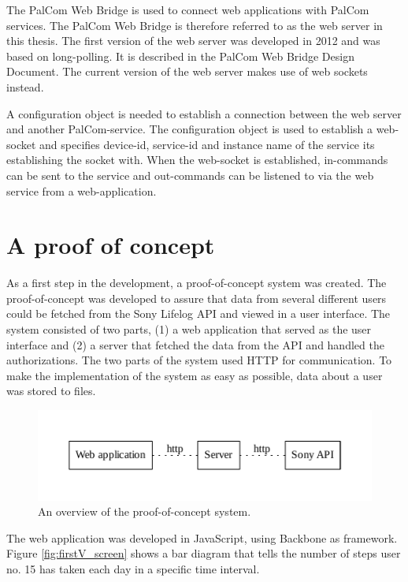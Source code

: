 \documentclass{cslthse-msc}
\begin{document}
The PalCom Web Bridge is used to connect web applications with PalCom services.  The PalCom Web Bridge is therefore referred to as the web server in this thesis. The first version of the web server was developed in 2012 and was based on long-polling. It is described in the PalCom Web Bridge Design Document\cite{webServer}. The current version of the web server makes use of web sockets instead. 

A configuration object is needed to establish a connection between the web server and another PalCom-service. The configuration object is used to establish a web-socket and specifies device-id, service-id and instance name of the service its establishing the socket with. When the web-socket is established, in-commands can be sent to the service and out-commands can be listened to via the web service from a web-application.


\section{A proof of concept}

As a first step in the development, a proof-of-concept system was created. The proof-of-concept was developed to assure that data from several different users could be fetched from the Sony Lifelog API and viewed in a user interface. The system consisted of two parts, (1) a web application that served as the user interface and (2) a server that fetched the data from the API and handled the authorizations. The two parts of the system used HTTP for communication. To make the implementation of  the system as easy as possible, data about a user was stored to files. 

\begin{figure}[!hbt]
\centering
\includegraphics[scale=0.8]{firs_verison.pdf} 
\caption{An overview of the proof-of-concept system.}\label{fig:firstV}
\end{figure}

The web application was developed in JavaScript, using Backbone as framework. Figure \ref{fig:firstV_screen} shows a bar diagram that tells the number of steps user no. 15 has taken each day in a specific time interval.
\end{document}
